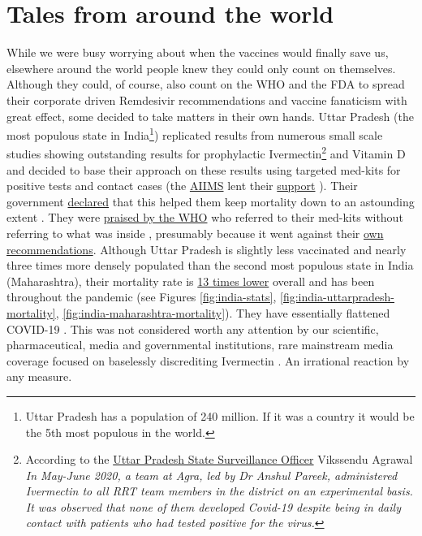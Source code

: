\documentclass[11pt,a4paper,notitlepage]{report}
\begin{document}
\section*{Tales from around the world}

While we were busy worrying about when the vaccines would finally save us, elsewhere around the world people knew they could only count on themselves. Although they could, of course, also count on the WHO and the FDA to spread their corporate driven Remdesivir recommendations and vaccine fanaticism with great effect, some decided to take matters in their own hands. Uttar Pradesh (the most populous state in India\footnote{Uttar Pradesh has a population of 240 million. If it was a country it would be the 5th most populous in the world.}) replicated results from numerous small scale studies showing outstanding results for prophylactic Ivermectin\footnote{According to the \href{https://indianexpress.com/article/cities/lucknow/uttar-pradesh-government-says-ivermectin-helped-to-keep-deaths-low-7311786/}{Uttar Pradesh State Surveillance Officer} Vikssendu Agrawal \cite{indianexpress12052021} \textit{In May-June 2020, a team at Agra, led by Dr Anshul Pareek, administered Ivermectin to all RRT team members in the district on an experimental basis. It was observed that none of them developed Covid-19 despite being in daily contact with patients who had tested positive for the virus.}} and Vitamin D and decided to base their approach on these results using targeted med-kits for positive tests and contact cases (the \href{https://www.aiims.edu/en.html}{AIIMS} lent their \href{https://www.cureus.com/articles/64807-prophylactic-role-of-ivermectin-in-severe-acute-respiratory-syndrome-coronavirus-2-infection-among-healthcare-workers}{support} \cite{Behera2021-qu}). Their government \href{https://indianexpress.com/article/cities/lucknow/uttar-pradesh-government-says-ivermectin-helped-to-keep-deaths-low-7311786/}{declared} that this helped them keep mortality down to an astounding extent \cite{indianexpress12052021}. They were \href{https://www.who.int/india/news/feature-stories/detail/uttar-pradesh-going-the-last-mile-to-stop-covid-19}{praised by the WHO} \cite{who07052021} who referred to their med-kits without referring to what was inside \cite{medicalupdateonline21052021} \cite{hindu14092020}, presumably because it went against their \href{https://www.who.int/news-room/feature-stories/detail/who-advises-that-ivermectin-only-be-used-to-treat-covid-19-within-clinical-trials}{own recommendations}. Although Uttar Pradesh is slightly less vaccinated and nearly three times more densely populated than the second most populous state in India (Maharashtra), their mortality rate is \hyperref[fig:india-stats]{13 times lower} overall and has been throughout the pandemic (see Figures \ref{fig:india-stats}, \ref{fig:india-uttarpradesh-mortality}, \ref{fig:india-maharashtra-mortality}). They have essentially flattened COVID-19 \cite{hindustantimes19092021}. This was not considered worth any attention by our scientific, pharmaceutical, media and governmental institutions, rare mainstream media coverage focused on baselessly discrediting Ivermectin \cite{torontoStar28012022}. An irrational reaction by any measure.
\end{document}
